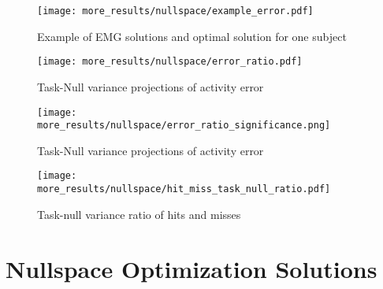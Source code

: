 \documentclass[../main.tex]{subfiles}
\begin{document}
\begin{figure}[H]%
  \centering
  \texttt{[image: more\_results/nullspace/example\_error.pdf]}
  \caption[Example of EMG solutions and optimal solution for one subject]{Example of EMG solutions and optimal solution for one subject}\label{fig:example_error}
\end{figure}

\begin{figure}[H]%
  \centering
  \texttt{[image: more\_results/nullspace/error\_ratio.pdf]}
  \caption[Task-Null variance projections of activity error]{Task-Null variance projections of activity error}\label{fig:error_ratio}
\end{figure}

\begin{figure}[H]%
  \centering
  \texttt{[image: more\_results/nullspace/error\_ratio\_significance.png]}
  \caption[Significance matrix for task-null variance ratios of error]{Task-Null variance projections of activity error}\label{fig:error_ratio_significance}
\end{figure}

\begin{figure}[H]%
  \centering
    \texttt{[image: more\_results/nullspace/hit\_miss\_task\_null\_ratio.pdf]}
    \caption[Task-null variance ratio of hits and misses]{Task-null variance ratio of hits and misses}\label{fig:hit_miss_nullspace}
\end{figure}




\section{Nullspace Optimization Solutions}
\end{document}
